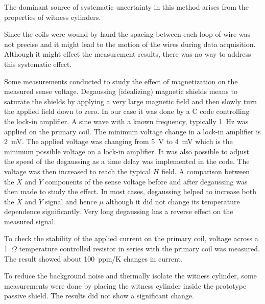 


The dominant source of systematic uncertainty in this method arises
from the properties of witness cylinders. 

Since the coils were wound by hand the spacing between each loop of wire was not precise and it might lead to the motion of the wires during data acquisition. Although it might effect the measurement results, there was no way to address this systematic effect.


Some measurements conducted to study the effect of magnetization on the measured sense voltage. Degaussing
(idealizing) magnetic shields means to saturate the shields by
applying a very large magnetic field and then slowly turn the
applied field down to zero. In our case it was done by a C code controlling the lock-in amplifier. A sine wave with a known frequency, typically 1~Hz was applied on the primary coil. The minimum voltage change in a lock-in amplifier is 2~mV. The applied voltage was changing from 5~V to 4~mV which is the minimum possible voltage on a lock-in amplifier. It was also possible to adjust the speed of the degaussing as a time delay was implemented in the code.
The voltage was then increased to reach the typical $H$ field.
A comparison between the $X$ and $Y$ components of the sense voltage before and after degaussing was then made to study the effect.
In most cases, degaussing helped to
increase both the $X$ and $Y$ signal and hence $\mu$ although it did not change its temperature dependence significantly. Very long degaussing has a reverse effect on the measured signal.


To check the stability of the applied current on the primary coil, voltage across a 1~$\Omega$ temperature controlled resistor in series with the primary coil was measured. The result showed about 100~ppm/K changes in current.

To reduce the background noise and
thermally isolate the witness cylinder, some measurements were done by
placing the witness cylinder inside the prototype passive shield. The
results did not show a significant change.


